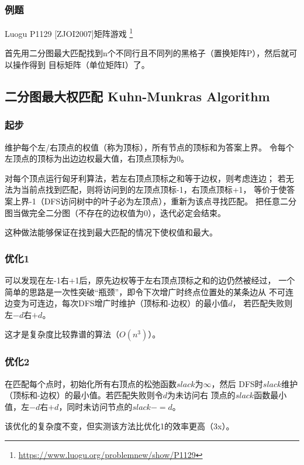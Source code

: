 \subsubsection{例题}

Luogu P1129 [ZJOI2007]矩阵游戏
\footnote{\url{https://www.luogu.org/problemnew/show/P1129}}

首先用二分图最大匹配找到n个不同行且不同列的黑格子（置换矩阵P），然后就可以操作得到
目标矩阵（单位矩阵I）了。



\subsection{二分图最大权匹配 Kuhn-Munkras Algorithm}
\subsubsection{起步}
维护每个左/右顶点的权值（称为顶标），所有节点的顶标和为答案上界。
令每个左顶点的顶标为出边边权最大值，右顶点顶标为0。

对每个顶点运行匈牙利算法，若左右顶点顶标之和等于边权，则考虑连边；
若无法为当前点找到匹配，则将访问到的左顶点顶标-1，右顶点顶标+1，
等价于使答案上界-1（DFS访问树中的叶子必为左顶点），重新为该点寻找匹配。
把任意二分图当做完全二分图（不存在的边权值为0），迭代必定会结束。

这种做法能够保证在找到最大匹配的情况下使权值和最大。
\subsubsection{优化1}
可以发现在左-1右+1后，原先边权等于左右顶点顶标之和的边仍然被经过，
一个简单的思路是一次性突破``瓶颈''，即令下次增广时终点位置处的某条边从
不可连边变为可连边，每次DFS增广时维护（顶标和-边权）的最小值$d$，
若匹配失败则左$-d$右$+d$。

这才是复杂度比较靠谱的算法（$O(n^3)$）。
\subsubsection{优化2}
在匹配每个点时，初始化所有右顶点的松弛函数$slack$为$\infty$，然后
DFS时$slack$维护（顶标和-边权）的最小值。若匹配失败则令$d$为未访问右
顶点的$slack$函数最小值，左$-d$右$+d$，同时未访问节点的$slack-=d$。

该优化的复杂度不变，但实测该方法比优化1的效率更高（3x）。
